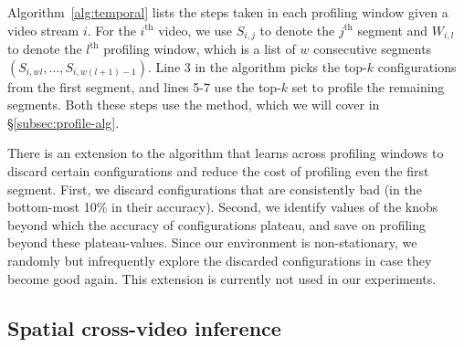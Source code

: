 
Algorithm~\ref{alg:temporal} lists the steps taken in each profiling window given a video stream  $i$. For the $i^\textrm{th}$ video, we use $S_{i,j}$ to denote the $j^\textrm{th}$ segment and $W_{i,l}$
to denote the $l^\textrm{th}$ profiling window, which is a list of $w$ consecutive segments 
$(S_{i,wl},\dots,S_{i,w(l+1)-1})$. Line 3 in the algorithm picks the top-$k$ configurations from the first segment, and lines 5-7 use the top-$k$ set to profile the remaining segments. Both these steps use the \Profile method, which we will cover in \S\ref{subsec:profile-alg}.


There is an extension to the algorithm that learns across profiling windows to discard certain configurations and reduce the cost of profiling even the first segment. First, we discard configurations that are consistently bad (in the bottom-most 10\% in their accuracy). Second, we identify values of the knobs beyond which the accuracy of configurations plateau, and save on profiling beyond these plateau-values. %
Since our environment is non-stationary, we randomly but infrequently explore the discarded configurations in case they become good again. This extension is currently not used in our experiments.

\subsection{Spatial cross-video inference}
\label{subsec:spatial-impl}

